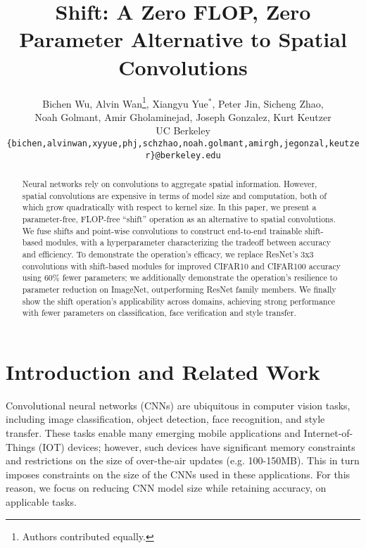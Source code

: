 \documentclass[10pt,twocolumn,letterpaper]{article}
\begin{document}
\title{Shift: A Zero FLOP, Zero Parameter Alternative to Spatial Convolutions}

\author{Bichen Wu, Alvin Wan\thanks{Authors contributed equally.}, Xiangyu Yue$^*$, Peter Jin, Sicheng Zhao, \\Noah Golmant, Amir Gholaminejad, Joseph Gonzalez, Kurt Keutzer \\
UC Berkeley\\
{\tt\small \{bichen,alvinwan,xyyue,phj,schzhao,noah.golmant,amirgh,jegonzal,keutzer\}@berkeley.edu}
}

\maketitle

\begin{abstract}
Neural networks rely on convolutions to aggregate spatial information. However, spatial convolutions are expensive in terms of model size and computation, both of which grow quadratically with respect to kernel size. In this paper, we present a parameter-free, FLOP-free ``shift'' operation as an alternative to spatial convolutions. We fuse shifts and point-wise convolutions to construct end-to-end trainable shift-based modules, with a hyperparameter characterizing the tradeoff between accuracy and efficiency. To demonstrate the operation's efficacy, we replace ResNet's 3x3 convolutions with shift-based modules for improved CIFAR10 and CIFAR100 accuracy using 60\% fewer parameters; we additionally demonstrate the operation's resilience to parameter reduction on ImageNet, outperforming ResNet family members. We finally show the shift operation's applicability across domains, achieving strong performance with fewer parameters on classification, face verification and style transfer.

\end{abstract}
\section{Introduction and Related Work}


Convolutional neural networks (CNNs) are ubiquitous in computer vision tasks, including image classification, object detection, face recognition, and style transfer. These tasks enable many emerging mobile applications and Internet-of-Things (IOT) devices; however, such devices have significant memory constraints and restrictions on the size of over-the-air updates (e.g. 100-150MB). This in turn imposes constraints on the size of the CNNs used in these applications. For this reason, we focus on reducing CNN model size while retaining accuracy, on applicable tasks. 
\end{document}
